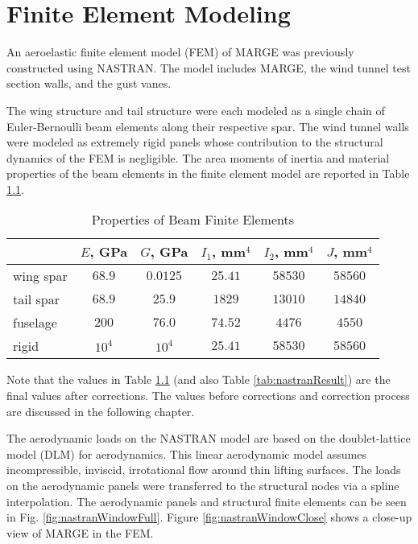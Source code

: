 \chapter{Finite Element Modeling}
\label{ch:nastran}

An aeroelastic finite element model (FEM) of MARGE was previously constructed using NASTRAN. The model includes MARGE, the wind tunnel test section walls, and the gust vanes.


The wing structure and tail structure were each modeled as a single chain of Euler-Bernoulli beam elements along their respective spar. The wind tunnel walls were modeled as extremely rigid panels whose contribution to the structural dynamics of the FEM is negligible. The area moments of inertia and material properties of the beam elements in the finite element model are reported in Table \ref{tab:beamInertia}.
\begin{table}[H]
    \centering
    \caption{Properties of Beam Finite Elements}
    \begin{tabular}{lccccc}
        \hline\hline
                  & $E$, GPa & $G$, GPa & $I_1$, mm$^4$ & $I_2$, mm$^4$ & $J$, mm$^4$ \\
        \hline
        wing spar & $68.9$   & $0.0125$ & $25.41$       & $58530$       & $58560$     \\
        tail spar & $68.9$   & $25.9$   & $1829$        & $13010$       & $14840$     \\
        fuselage  & $200$    & $76.0$   & $74.52$       & $4476 $       & $4550 $     \\
        rigid     & $10^4$   & $10^4$   & $25.41$       & $58530$       & $58560$     \\
        \hline\hline
    \end{tabular}
    \label{tab:beamInertia}
\end{table}
Note that the values in Table \ref{tab:beamInertia} (and also Table \ref{tab:nastranResult}) are the final values after corrections. The values before corrections and correction process are discussed in the following chapter.

The aerodynamic loads on the NASTRAN model are based on the doublet-lattice model (DLM) for aerodynamics. This linear aerodynamic model assumes incompressible, inviscid, irrotational flow around thin lifting surfaces. The loads on the aerodynamic panels were transferred to the structural nodes via a spline interpolation. The aerodynamic panels and structural finite elements can be seen in Fig. \ref{fig:nastranWindowFull}. Figure \ref{fig:nastranWindowClose} shows a close-up view of MARGE in the FEM.

